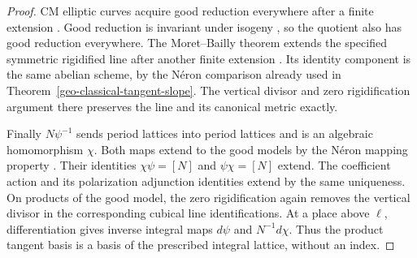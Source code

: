 \begin{proof}
CM elliptic curves acquire good reduction everywhere after a
finite extension \cite[Theorem~12.14]{cm-milne-mf}.
Good reduction is invariant under isogeny
\cite[Theorem~1 and Corollary~2, p.~493]{cm-serre-tate},
so the quotient also has good reduction everywhere.
The Moret--Bailly theorem extends the specified symmetric
rigidified line after another finite extension
\cite[Theorem~3.4(i)]{pazuki-theta-faltings}.
Its identity component is the same abelian scheme, by the
N\'eron comparison already used in
Theorem~\ref{geo-classical-tangent-slope}.
The vertical divisor and zero rigidification argument there
preserves the line and its canonical metric exactly.

Finally $N\psi^{-1}$ sends period lattices into period lattices
and is an algebraic homomorphism $\chi$.
Both maps extend to the good models by the N\'eron mapping
property \cite[Definition~5.1 and Example~5.3]{cm-conrad-minimal}.
Their identities $\chi\psi=[N]$ and $\psi\chi=[N]$ extend.
The coefficient action and its polarization adjunction identities
extend by the same uniqueness. On products of the good model,
the zero rigidification again removes the vertical divisor in
the corresponding cubical line identifications.
At a place above $\ell$, differentiation gives inverse integral
maps $d\psi$ and $N^{-1}d\chi$. Thus the product tangent basis
is a basis of the prescribed integral lattice, without an index.
\end{proof}

